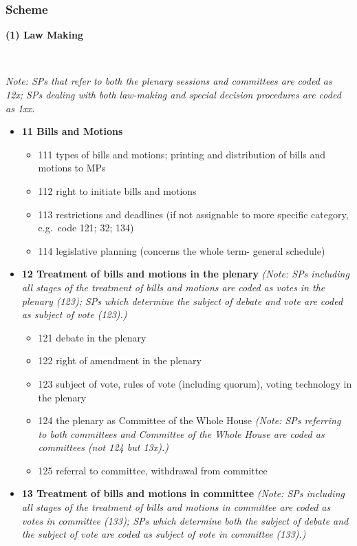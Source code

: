\documentclass[10pt,]{article}
\providecommand{\tightlist}{%
  \setlength{\itemsep}{0pt}\setlength{\parskip}{0pt}}
\begin{document}
\subsubsection{Scheme}\label{scheme}

\textbf{(1) Law Making}

~

\emph{Note: SPs that refer to both the plenary sessions and committees
are coded as 12x; SPs dealing with both law-making and special decision
procedures are coded as 1xx.}

\begin{itemize}
\tightlist
\item
  \textbf{11 Bills and Motions}

  \begin{itemize}
  \tightlist
  \item
    111 types of bills and motions; printing and distribution of bills
    and motions to MPs
  \item
    112 right to initiate bills and motions
  \item
    113 restrictions and deadlines (if not assignable to more specific
    category, e.g.~code 121; 32; 134)
  \item
    114 legislative planning (concerns the whole term- general schedule)
  \end{itemize}
\item
  \textbf{12 Treatment of bills and motions in the plenary} \emph{(Note:
  SPs including all stages of the treatment of bills and motions are
  coded as votes in the plenary (123); SPs which determine the subject
  of debate and vote are coded as subject of vote (123).)}

  \begin{itemize}
  \tightlist
  \item
    121 debate in the plenary
  \item
    122 right of amendment in the plenary
  \item
    123 subject of vote, rules of vote (including quorum), voting
    technology in the plenary
  \item
    124 the plenary as Committee of the Whole House \emph{(Note: SPs
    referring to both committees and Committee of the Whole House are
    coded as committees (not 124 but 13x).)}
  \item
    125 referral to committee, withdrawal from committee
  \end{itemize}
\item
  \textbf{13 Treatment of bills and motions in committee} \emph{(Note:
  SPs including all stages of the treatment of bills and motions in
  committee are coded as votes in committee (133); SPs which determine
  both the subject of debate and the subject of vote are coded as
  subject of vote in committee (133).)}


\end{itemize}
\end{document}
